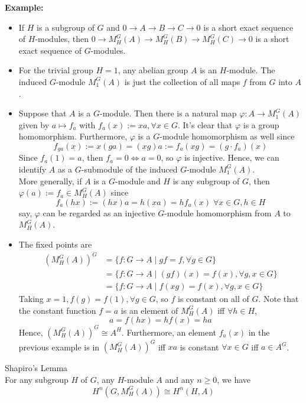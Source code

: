 \noindent\textbf{Example:} \begin{itemize}
    \item If $H$ is a subgroup of $G$ and $0\to A\to B\to C\to0$ is a short exact sequence of $H$-modules, then $0\to M_H^G(A) \to M_H^G(B) \to M_H^G(C)\to0$ is a short exact sequence of $G$-modules.

    \item For the trivial group $H=1$, any abelian group $A$ is an $H$-module. The induced $G$-module $M_1^G(A)$ is just the collection of all maps $f$ from $G$ into $A$.

    \item Suppose that $A$ is a $G$-module. Then there is a natural map $\varphi: A\to M_1^G(A)$ given by $a\mapsto f_a$ with $f_a (x):=xa ,\forall x\in G$. It's clear that $\varphi$ is a group homomorphism. Furthermore, $\varphi$ is a $G$-module homomorphism as well since
    \[
    f_{ga} (x):= x(ga)=(xg)a :=f_a(xg)=(g \cdot f_a) (x)
    \]
    Since $f_a(1)=a$, then $f_a=0 \Leftrightarrow a=0$, so $\varphi$ is injective. Hence, we can identify $A$ as a $G$-submodule of the induced $G$-module $M_1^G(A)$.\\
    More generally, if $A$ is a $G$-module and $H$ is any subgroup of $G$, then $\varphi(a) := f_a\in M_H^G(A)$ since
    \[
    f_a(hx) := (hx)a= h(xa)= hf_a(x) \;\forall x\in G,h\in H
    \]
    say, $\varphi$ can be regarded as an injective $G$-module homomorphism from $A$ to $M_H^G(A)$.

    \item The fixed points are
    \begin{align*}
        (M_H^G(A))^G &= \{f: G\to A\mid gf=f,\forall g\in G\}\\
        &= \{f:G\to A\mid (gf)(x) = f(x) ,\forall g,x\in G\}\\
        &= \{f:G\to A\mid f(xg)= f(x),\forall g,x\in G\}
    \end{align*}
    Taking $x=1,f(g)=f(1), \forall g\in G$, so $f$ is constant on all of $G$. Note that the constant function $f=a$ is an element of $M_H^G(A)$ iff $\forall h\in H$,
    \[
    a=f(hx)=hf(x)=ha
    \]
    Hence, $(M_H^G(A))^G\cong A^H$. Furthermore, an element $f_a(x)$ in the previous example is in $(M_H^G(A))^G$ iff $xa$ is constant $\forall x\in G$ iff $a\in A^G$.
\end{itemize}


\begin{theorem}{Shapiro's Lemma}\\
For any subgroup $H$ of $G$, any $H$-module $A$ and any $n\geq 0$, we have
\[
H^n(G,M_H^G(A)) \cong H^n(H,A)
\]
\end{theorem}


